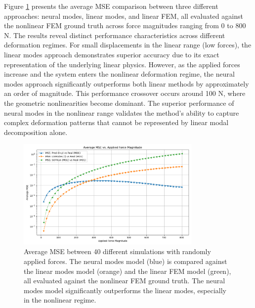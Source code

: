 Figure \ref{fig:static_mse_comparison} presents the average MSE comparison between three different approaches: neural modes, linear modes, and linear FEM, all evaluated against the nonlinear FEM ground truth across force magnitudes ranging from 0 to 800 N. The results reveal distinct performance characteristics across different deformation regimes. For small displacements in the linear range (low forces), the linear modes approach demonstrates superior accuracy due to its exact representation of the underlying linear physics. However, as the applied forces increase and the system enters the nonlinear deformation regime, the neural modes approach significantly outperforms both linear methods by approximately an order of magnitude. This performance crossover occurs around 100 N, where the geometric nonlinearities become dominant. The superior performance of neural modes in the nonlinear range validates the method's ability to capture complex deformation patterns that cannot be represented by linear modal decomposition alone.

\begin{figure}[H]
    \centering
    \includegraphics[width=0.8\textwidth]{Images/beam_static_mse.png}
    \caption{Average MSE between 40 different simulations with randomly applied forces. The neural modes model (blue) is compared against the linear modes model (orange) and the linear FEM model (green), all evaluated against the nonlinear FEM ground truth. The neural modes model significantly outperforms the linear modes, especially in the nonlinear regime.}
    \label{fig:static_mse_comparison}
\end{figure}

